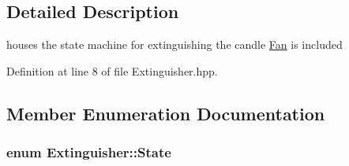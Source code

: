 \subsection{Detailed Description}
houses the state machine for extinguishing the candle \hyperlink{classFan}{Fan} is included 

Definition at line 8 of file Extinguisher.\-hpp.



\subsection{Member Enumeration Documentation}
\hypertarget{classExtinguisher_a969a7cce3382fc5d67f687540896e3ab}{
\subsubsection[{State}]{\setlength{\rightskip}{0pt plus 5cm}enum {\bf Extinguisher\-::\-State}\hspace{0.3cm}{\ttfamily [private]}}}\label{classExtinguisher_a969a7cce3382fc5d67f687540896e3ab}
